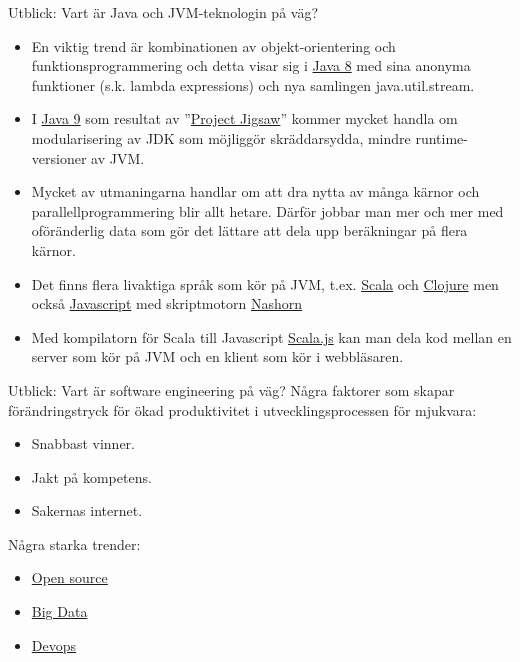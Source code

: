 \documentclass{lecturenotes}
\begin{document}
\begin{Slide}{Utblick: Vart är Java och JVM-teknologin på väg?}\footnotesize
\begin{itemize}
\item En viktig trend är kombinationen av objekt-orientering och funktionsprogrammering och detta visar sig i \href{http://www.oracle.com/technetwork/java/javase/8-whats-new-2157071.html}{Java 8} med sina anonyma funktioner (s.k. lambda expressions) och nya samlingen java.util.stream.
\item I \href{http://www.javaworld.com/article/2984263/java-platform/oracle-says-java-9-modules-will-be-a-boon-for-developers.html}{Java 9} som resultat av ''\href{http://www.infoworld.com/article/2895889/java/oracle-java-9-future-lego-like.html}{Project Jigsaw}'' kommer mycket handla om modularisering av JDK som möjliggör skräddarsydda, mindre runtime-versioner av JVM.	
\item Mycket av utmaningarna handlar om att dra nytta av många kärnor och parallellprogrammering blir allt hetare. Därför jobbar man mer och mer med oföränderlig data som gör det lättare att dela upp beräkningar på flera kärnor.
\item Det finns flera livaktiga språk som kör på JVM, t.ex.  \href{https://sv.wikipedia.org/wiki/Scala\_\%28programspr\%C3\%A5k\%29}{Scala} och  \href{https://sv.wikipedia.org/wiki/Clojure}{Clojure} men också \href{https://sv.wikipedia.org/wiki/Javascript}{Javascript} med skriptmotorn \href{https://en.wikipedia.org/wiki/Nashorn\_\%28JavaScript_engine\%29}{Nashorn} 
\item Med kompilatorn för Scala till Javascript \href{http://www.scala-js.org/}{Scala.js} kan man dela kod mellan en server som kör på JVM och en klient som kör i webbläsaren.
\end{itemize}
\end{Slide}

\begin{Slide}{Utblick: Vart är software engineering  på väg?}
Några faktorer som skapar förändringstryck för ökad produktivitet i utvecklingsprocessen för mjukvara:
\begin{itemize}
\item Snabbast vinner. 
\item Jakt på kompetens. 
\item Sakernas internet.
\end{itemize}
\vspace{1em}
Några starka trender:
\begin{itemize}
\item \href{https://en.wikipedia.org/wiki/Open_source}{Open source}
\item \href{https://en.wikipedia.org/wiki/Big_data}{Big Data}
\item \href{https://en.wikipedia.org/wiki/DevOps}{Devops}
\end{itemize}
\end{Slide}
\end{document}
